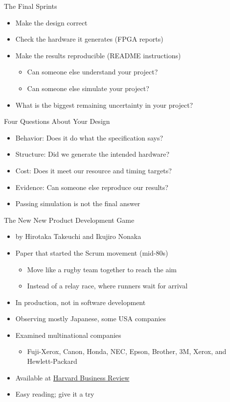 \begin{frame}[fragile]{The Final Sprints}
\begin{itemize}
\item Make the design correct
\item Check the hardware it generates (FPGA reports)
\item Make the results reproducible (README instructions)
\begin{itemize}
\item Can someone else understand your project?
\item Can someone else simulate your project?
\end{itemize}
\item What is the biggest remaining uncertainty in your project?
\end{itemize}
\end{frame}

\begin{frame}[fragile]{Four Questions About Your Design}
\begin{itemize}
\item Behavior: Does it do what the specification says?
\item Structure: Did we generate the intended hardware?
\item Cost: Does it meet our resource and timing targets?
\item Evidence: Can someone else reproduce our results?
\item Passing simulation is not the final answer
\end{itemize}
\end{frame}


\begin{frame}[fragile]{The New New Product Development Game}
\begin{itemize}
\item by Hirotaka Takeuchi and Ikujiro Nonaka
\item Paper that started the Scrum movement (mid-80s)
\begin{itemize}
\item Move like a rugby team together to reach the aim
\item Instead of a relay race, where runners wait for arrival
\end{itemize}
\item In production, not in software development
\item Observing mostly Japanese, some USA companies
\item Examined multinational companies
\begin{itemize}
\item Fuji-Xerox, Canon, Honda, NEC, Epson, Brother, 3M, Xerox, and Hewlett-Packard
\end{itemize}
\item Available at \href{https://hbr.org/1986/01/the-new-new-product-development-game}{Harvard Business Review}
\item Easy reading; give it a try
\end{itemize}
\end{frame}

